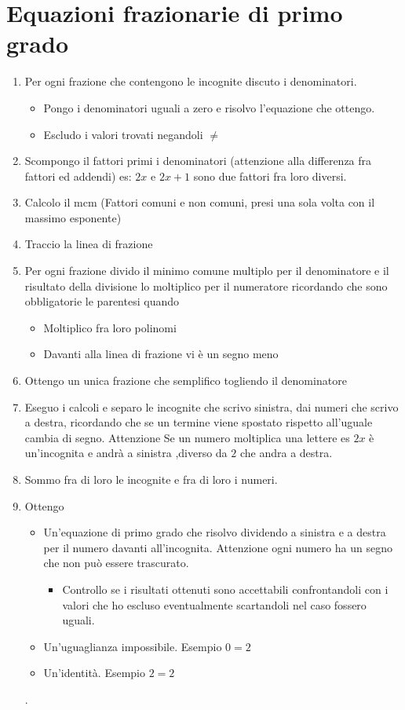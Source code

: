 \chapter{Equazioni frazionarie di primo grado}
\label{cha:Equazionefrazionariaprimogrado}
\minitoc
\mtcskip                                %
\minilof                                %
\mtcskip                                %
\minilot
\begin{enumerate}
\item Per ogni frazione che contengono le incognite discuto i denominatori.
	\begin{itemize}
	\item Pongo i denominatori uguali a zero e risolvo l'equazione che ottengo.
	\item Escludo i valori trovati negandoli $\neq$
	\end{itemize}
	\item  Scompongo il fattori primi i denominatori (attenzione alla differenza fra fattori ed addendi) es: $2x$ e  $2x+1$ sono due fattori fra loro diversi.
	\item Calcolo il mcm (Fattori comuni e non comuni, presi una sola volta con il massimo esponente)
	\item Traccio la linea di frazione 
	\item Per ogni frazione divido il minimo comune multiplo per il denominatore e il risultato della divisione lo moltiplico per il numeratore ricordando che sono obbligatorie le parentesi quando 
	\begin{itemize}
	\item Moltiplico fra loro polinomi
	\item Davanti alla linea di frazione vi è un segno meno
	\end{itemize}
	\item Ottengo un unica frazione che semplifico togliendo il denominatore
	\item Eseguo i calcoli e separo le incognite che scrivo sinistra, dai numeri che scrivo a destra, ricordando che  se un termine viene spostato rispetto all'uguale cambia di segno. Attenzione Se un numero moltiplica una lettere es $2x$ è un'incognita e andrà a sinistra ,diverso da $2$ che andra a destra.
	\item Sommo fra di loro le incognite e fra di loro i numeri.
	\item Ottengo 
	\begin{itemize}
	\item Un'equazione di primo grado che risolvo dividendo  a sinistra e a destra per il numero davanti all'incognita. Attenzione ogni numero ha un segno che non può essere trascurato.
	\begin{itemize}
	\item Controllo se i risultati ottenuti  sono accettabili confrontandoli con i valori che ho escluso eventualmente scartandoli nel caso fossero uguali.
	\end{itemize}
	\item Un'uguaglianza impossibile. Esempio $0=2$
	\item Un'identità. Esempio $2=2$
	\end{itemize}
.\end{enumerate}
